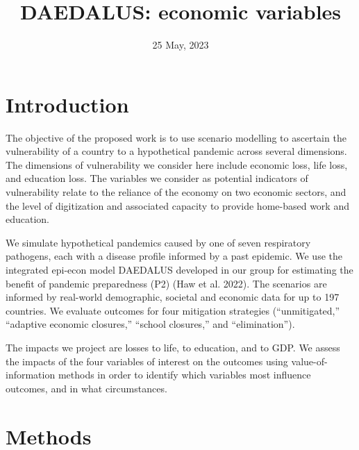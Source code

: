 \documentclass[
]{article}
\title{DAEDALUS: economic variables}
\author{}
\date{\vspace{-2.5em}25 May, 2023}
\begin{document}
\maketitle

{
\setcounter{tocdepth}{5}
\tableofcontents
}
\pagestyle{plain}


\newpage

\hypertarget{introduction}{%
\section{Introduction}\label{introduction}}

The objective of the proposed work is to use scenario modelling to ascertain the vulnerability of a country to a hypothetical pandemic across several dimensions. The dimensions of vulnerability we consider here include economic loss, life loss, and education loss. The variables we consider as potential indicators of vulnerability relate to the reliance of the economy on two economic sectors, and the level of digitization and associated capacity to provide home-based work and education.

We simulate hypothetical pandemics caused by one of seven respiratory pathogens, each with a disease profile informed by a past epidemic. We use the integrated epi-econ model DAEDALUS developed in our group for estimating the benefit of pandemic preparedness (P2) (Haw et al. 2022). The scenarios are informed by real-world demographic, societal and economic data for up to 197 countries. We evaluate outcomes for four mitigation strategies (``unmitigated,'' ``adaptive economic closures,'' ``school closures,'' and ``elimination'').

The impacts we project are losses to life, to education, and to GDP. We assess the impacts of the four variables of interest on the outcomes using value-of-information methods in order to identify which variables most influence outcomes, and in what circumstances.

\hypertarget{methods}{%
\section{Methods}\label{methods}}
\end{document}
